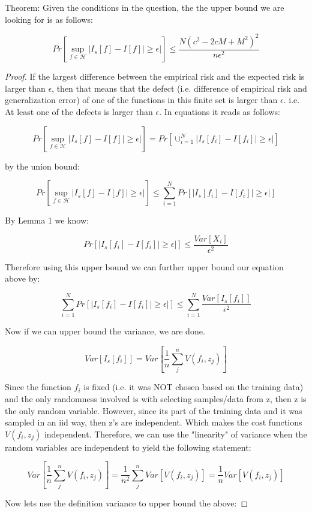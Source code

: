 \documentclass[12pt]{report}
\begin{document}
Theorem: Given the conditions in the question, the the upper bound we are looking for is as follows:

$$Pr[ \sup\limits_{f \in \mathcal{H}}  | I_s[f] - I[f] | \geq \epsilon|] \leq \frac{N(c^2-2cM+M^2)^2}{n \epsilon^2}$$
\begin{proof}

If the largest difference between the empirical risk and the expected risk is larger than $\epsilon$, then that means that the defect (i.e. difference of empirical risk and generalization error) of one of the functions in this finite set is larger than $\epsilon.$ 
i.e. At least one of the defects is larger than $\epsilon$. In equations it reads as follows:

$$Pr[ \sup\limits_{f \in \mathcal{H}}  | I_s[f] - I[f] | \geq \epsilon|] = Pr[\cup^{N}_{i=1} | I_s[f_i] - I[f_i] | \geq \epsilon|] $$

by the union bound:

$$Pr[ \sup\limits_{f \in \mathcal{H}}  | I_s[f] - I[f] | \geq \epsilon|]  \leq \sum^{N}_{i=1} Pr[| I_s[f_i] - I[f_i] | \geq \epsilon|] $$

By Lemma 1 we know:

$$ Pr[ | I_s[f_i] - I[f_i] | \geq \epsilon|] \leq \frac{ Var[X_i] }{ \epsilon^2 } $$

Therefore using this upper bound we can further upper bound our equation above by:

$$ \sum^{N}_{i=1} Pr[| I_s[f_i] - I[f_i] | \geq \epsilon|] \leq \sum^{N}_{i=1} \frac{ Var[I_s[f_i]] }{ \epsilon^2 }$$

Now if we can upper bound the variance, we are done.

$$ Var[I_s[f_i]] = Var[\frac{1}{n} \sum^n_j V(f_i,z_j)]$$

Since the function $f_i$ is fixed (i.e. it was NOT chosen based on the training data) and the only randomness involved is with selecting samples/data from z, then z is the only random variable. However, since its part of the training data and it was sampled in an iid way, then z's are independent. Which makes the cost functions $V(f_i,z_j)$ independent. Therefore, we can use the "linearity" of variance when the random variables are independent to yield the following statement:

$$ Var[\frac{1}{n} \sum^n_j V(f_i,z_j)] = \frac{1}{n^2} \sum^n_j Var[V(f_i,z_j)] = \frac{1}{n}Var[V(f_i,z_j)]  $$

Now lets use the definition variance to upper bound the above:


\end{proof}
\end{document}
